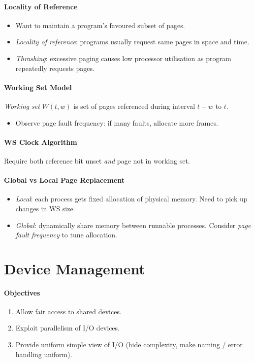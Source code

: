 \documentclass[twocolumn,english]{article}
\begin{document}
\paragraph{Locality of Reference}
\begin{itemize}
\item Want to maintain a program's favoured subset of pages.
\item \emph{Locality of reference}: programs usually request same pages
in space and time.
\item \emph{Thrashing}: excessive paging causes low processor utilisation
as program repeatedly requests pages.
\end{itemize}

\paragraph{Working Set Model}

\emph{Working set} $W\left(t,w\right)$ is set of pages referenced
during interval $t-w$ to $t$.
\begin{itemize}
\item Observe page fault frequency: if many faults, allocate more frames.
\end{itemize}

\paragraph{WS Clock Algorithm}

Require both reference bit unset \emph{and} page not in working set.

\paragraph{Global vs Local Page Replacement}
\begin{itemize}
\item \emph{Local}: each process gets fixed allocation of physical memory.
Need to pick up changes in WS size.
\item \emph{Global}: dynamically share memory between runnable processes.
Consider \emph{page fault frequency} to tune allocation.
\end{itemize}

\section{Device Management}

\paragraph{Objectives}
\begin{enumerate}
\item Allow fair access to shared devices.
\item Exploit parallelism of I/O devices.
\item Provide uniform simple view of I/O (hide complexity, make naming /
error handling uniform).
\end{enumerate}
\end{document}
